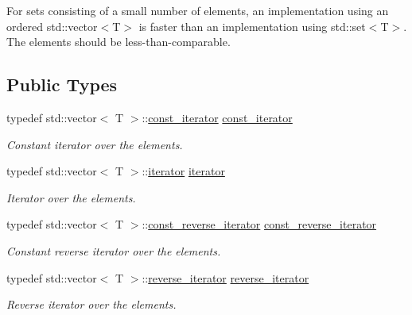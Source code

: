 For sets consisting of a small number of elements, an implementation using an ordered std::vector$<$T$>$ is faster than an implementation using std::set$<$T$>$. The elements should be less-than-comparable. \subsection*{Public Types}
\begin{CompactItemize}
\item 
\hypertarget{classdai_1_1smallSet_103c819872818d14a7234a1f618a815c}{
typedef std::vector$<$ T $>$::\hyperlink{classdai_1_1smallSet_103c819872818d14a7234a1f618a815c}{const\_\-iterator} \hyperlink{classdai_1_1smallSet_103c819872818d14a7234a1f618a815c}{const\_\-iterator}}
\label{classdai_1_1smallSet_103c819872818d14a7234a1f618a815c}

\begin{CompactList}\small\item\em Constant iterator over the elements. \item\end{CompactList}\item 
\hypertarget{classdai_1_1smallSet_254dd4f8cad9c7bce5522e9dbcfc4f49}{
typedef std::vector$<$ T $>$::\hyperlink{classdai_1_1smallSet_254dd4f8cad9c7bce5522e9dbcfc4f49}{iterator} \hyperlink{classdai_1_1smallSet_254dd4f8cad9c7bce5522e9dbcfc4f49}{iterator}}
\label{classdai_1_1smallSet_254dd4f8cad9c7bce5522e9dbcfc4f49}

\begin{CompactList}\small\item\em Iterator over the elements. \item\end{CompactList}\item 
\hypertarget{classdai_1_1smallSet_46882a9010267d41f447feb6aaf65cc1}{
typedef std::vector$<$ T $>$::\hyperlink{classdai_1_1smallSet_46882a9010267d41f447feb6aaf65cc1}{const\_\-reverse\_\-iterator} \hyperlink{classdai_1_1smallSet_46882a9010267d41f447feb6aaf65cc1}{const\_\-reverse\_\-iterator}}
\label{classdai_1_1smallSet_46882a9010267d41f447feb6aaf65cc1}

\begin{CompactList}\small\item\em Constant reverse iterator over the elements. \item\end{CompactList}\item 
\hypertarget{classdai_1_1smallSet_6dea3ee0aa40c4312e6278a7d17f516d}{
typedef std::vector$<$ T $>$::\hyperlink{classdai_1_1smallSet_6dea3ee0aa40c4312e6278a7d17f516d}{reverse\_\-iterator} \hyperlink{classdai_1_1smallSet_6dea3ee0aa40c4312e6278a7d17f516d}{reverse\_\-iterator}}
\label{classdai_1_1smallSet_6dea3ee0aa40c4312e6278a7d17f516d}

\begin{CompactList}\small\item\em Reverse iterator over the elements. \item\end{CompactList}\end{CompactItemize}
